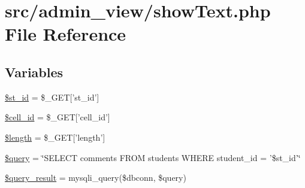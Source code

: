 \hypertarget{showText_8php}{\section{src/admin\-\_\-view/show\-Text.php \-File \-Reference}
\label{showText_8php}
}
\subsection*{\-Variables}
\begin{DoxyCompactItemize}
\item 
\hyperlink{showText_8php_ab68b86e23fd74e101c03130a49b24f66}{\$st\-\_\-id} = \$\-\_\-\-G\-E\-T\mbox{[}'st\-\_\-id'\mbox{]}
\item 
\hyperlink{showText_8php_a61dea27fb42757cdaae37a86b848807c}{\$cell\-\_\-id} = \$\-\_\-\-G\-E\-T\mbox{[}'cell\-\_\-id'\mbox{]}
\item 
\hyperlink{showText_8php_adf14d8e29912c1855022dfa252aa4087}{\$length} = \$\-\_\-\-G\-E\-T\mbox{[}'length'\mbox{]}
\item 
\hyperlink{showText_8php_af59a5f7cd609e592c41dc3643efd3c98}{\$query} = \char`\"{}\-S\-E\-L\-E\-C\-T comments \-F\-R\-O\-M students \-W\-H\-E\-R\-E student\-\_\-id = '\$st\-\_\-id'\char`\"{}
\item 
\hyperlink{showText_8php_ade0b3dacf5d65d8f2293ffa78561fe31}{\$query\-\_\-result} = mysqli\-\_\-query(\$dbconn, \$query)
\end{DoxyCompactItemize}


